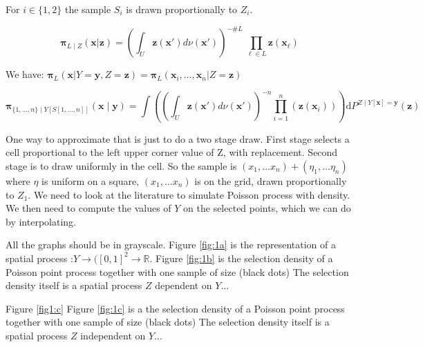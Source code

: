\documentclass[12pt]{article}
\theoremstyle{definition}
\theoremstyle{remark}
\newcommand{\dominantU}{\nu}
\newcommand{\sampledensity}{\mathbf{\pi}}
\newcommand{\derive}{\mathrm{d}}
\newcommand{\Sample}{S}
\newcommand{\position}{\mathbf{x}}
\newcommand{\Sampleindex}{L}
\newcommand{\Signal}{Y}
\newcommand{\signal}{\mathbf{y}}
\newcommand{\Desvar}{Z}
\newcommand{\desvar}{\mathbf{z}}
\begin{document}
For $i\in\{1,2\}$ the  sample $\Sample_i$ is drawn proportionally to $\Desvar_i$.




\begin{equation}\label{eq:oiujoij}
   \sampledensity_{\Sampleindex\mid \Desvar}\left(\position|\desvar\right)=\left(\int_{U}{\desvar\left(\position'\right)d\dominantU\left(\position'\right)}\right)^{-\#\Sampleindex}~\prod_{\ell\in \Sampleindex}{\desvar\left(\position_{\ell}\right)}
\end{equation}


We have:
$ \sampledensity_\Sampleindex\left(\position|\Signal=\signal,\Desvar=\desvar\right)= \sampledensity_\Sampleindex\left(\position_{i},\dots,\position_{n}|\Desvar=\desvar\right)$


\begin{equation}
    \sampledensity_{\{1,\ldots,n\}\mid\Signal[\Sample[1,\ldots,n]]}\left(\position\mid
    \signal\right)=\int\left({\left(\int_{U}{\desvar\left(\position'\right)d\dominantU\left(\position'\right)}\right)^{-n}}\prod_{i=1}^{n}\left({\desvar\left(\position_{i}\right)}\right)\right)  \derive P^{\Desvar\mid\Signal[\position]=
    \signal}(\desvar)
\end{equation}


One way to approximate that is just to do a two stage draw. First stage selects a cell proportional to the left upper corner value of Z, with replacement. Second stage is to draw uniformly in the cell.
So the sample is 
$(x_1,\ldots x_n)+(\eta_1,\ldots\eta_n)$ where $\eta$ is uniform on a square, $(x_1,\ldots x_n)$ is on the grid, drawn proportionally to $Z_1$.
We need to look at the literature to simulate Poisson process with density.
We then need to compute the values of $\Signal$ on the selected points, which we can do by interpolating.

{\color{red}All the graphs should be in grayscale.}
Figure \ref{fig:1a} is the representation of a spatial process :$\Signal\to([0,1]^2\to\mathbb{R}$.
Figure \ref{fig:1b} is the selection density of a Poisson point process together with one sample of size (black dots) The selection density itself is a spatial process $\Desvar$ dependent on $\Signal$...

Figure \ref{fig1:c} Figure \ref{fig:1c} is a  the selection density of a Poisson point process together with one sample of size (black dots) The selection density itself is a spatial process $\Desvar$ independent on $\Signal$...
\end{document}
